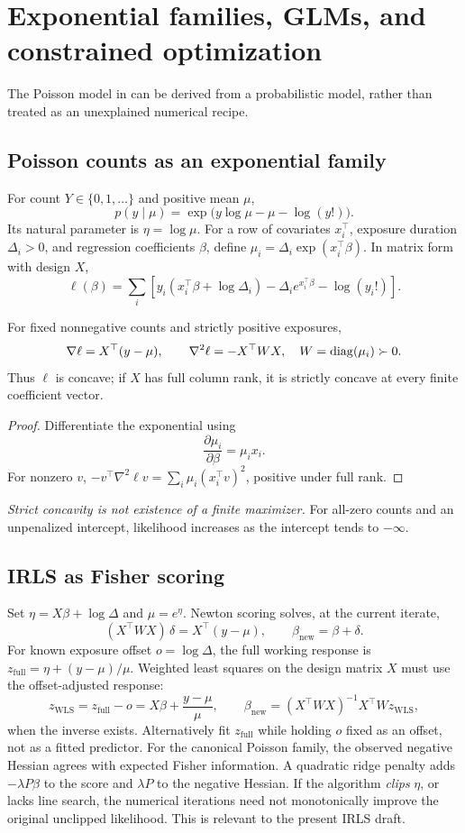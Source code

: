 \chapter[GLMs and optimization]{Exponential families, GLMs, and constrained optimization}
\label{ch:glm-optimization}
The Poisson model in 
can be derived from a probabilistic model, rather than treated
as an unexplained numerical recipe.

\section{Poisson counts as an exponential family}
For count $Y\in\{0,1,\ldots\}$ and positive mean $\mu$,
\[
p(y\mid\mu)=\exp\bigl(y\log\mu-\mu-\log(y!)\bigr).
\]
Its natural parameter is $\eta=\log\mu$. For a row of
covariates $x_i^\top$, exposure duration $\Delta_i>0$,
and regression coefficients $\beta$, define
$\mu_i=\Delta_i\exp(x_i^\top\beta)$.
In matrix form with design $X$,
\[
\ell(\beta)=\sum_i[y_i(x_i^\top\beta+\log\Delta_i)
 -\Delta_i e^{x_i^\top\beta}-\log(y_i!)].
\]
\begin{proposition}
For fixed nonnegative counts and strictly positive exposures,
\[
\nabla\ell=X^\top(y-\mu),\qquad
\nabla^2\ell=-X^\top W X,\quad W=\operatorname{diag}(\mu_i)\succ0.
\]
Thus $\ell$ is concave; if $X$ has full column rank, it is
strictly concave at every finite coefficient vector.
\end{proposition}
\begin{proof}
Differentiate the exponential using
\[\frac{\partial\mu_i}{\partial\beta}=\mu_i x_i.\]
For nonzero $v$, $-v^\top\nabla^2\ell v
=\sum_i\mu_i(x_i^\top v)^2$, positive under full rank.
\end{proof}
\emph{Strict concavity is not existence of a finite maximizer.}
For all-zero counts and an unpenalized intercept, likelihood
increases as the intercept tends to $-\infty$.

\section{IRLS as Fisher scoring}
Set $\eta=X\beta+\log\Delta$ and $\mu=e^\eta$.
Newton scoring solves, at the current iterate,
\[
(X^\top W X)\,\delta=X^\top(y-\mu),
\qquad \beta_{\mathrm{new}}=\beta+\delta.
\]
For known exposure offset $o=\log\Delta$, the full
working response is $z_{\mathrm{full}}=\eta+(y-\mu)/\mu$.
Weighted least squares on the design matrix $X$ must use
the offset-adjusted response:
\[
z_{\mathrm{WLS}}=z_{\mathrm{full}}-o
=X\beta+\frac{y-\mu}{\mu},\qquad
\beta_{\mathrm{new}}=(X^\top W X)^{-1}X^\top Wz_{\mathrm{WLS}},
\]
when the inverse exists. Alternatively fit $z_{\mathrm{full}}$
while holding $o$ fixed as an offset, not as a fitted predictor.
For the canonical Poisson family, the observed
negative Hessian agrees with expected Fisher information.
A quadratic ridge penalty adds $-\lambda P\beta$ to the score
and $\lambda P$ to the negative Hessian. If the algorithm
\emph{clips} $\eta$, or lacks line search, the numerical
iterations need not monotonically improve the original
unclipped likelihood. This is relevant to the present IRLS draft.

